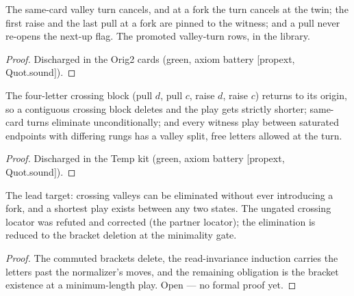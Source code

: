 \begin{theorem}\label{thm:valleyTurn}
\leanok
{}
The same-card valley turn cancels, and at a fork the turn
cancels at the twin; the first raise and the last pull at a fork
are pinned to the witness; and a pull never re-opens the next-up
flag.  The promoted valley-turn rows, in the library.
\end{theorem}

\begin{proof}
\leanok
Discharged in the Orig2 cards (green, axiom battery [propext, Quot.sound]).
\end{proof}

\begin{theorem}\label{thm:valleyKit}
\leanok
{}
The four-letter crossing block (pull $d$, pull $c$, raise $d$,
raise $c$) returns to its origin, so a contiguous crossing block
deletes and the play gets strictly shorter; same-card turns
eliminate unconditionally; and every witness play between
saturated endpoints with differing rungs has a valley split, free
letters allowed at the turn.
\end{theorem}

\begin{proof}
\leanok
Discharged in the Temp kit (green, axiom battery [propext, Quot.sound]).
\end{proof}

\begin{theorem}\label{thm:valleyTarget}
\leanok
{}
The lead target: crossing valleys can be eliminated without
ever introducing a fork, and a shortest play exists between any
two states.  The ungated crossing locator was refuted and
corrected (the partner locator); the elimination is reduced to
the bracket deletion at the minimality gate.
\end{theorem}

\begin{proof}
The commuted brackets delete, the read-invariance induction
carries the letters past the normalizer's moves, and the
remaining obligation is the bracket existence at a
minimum-length play.  Open --- no formal proof yet.
\end{proof}

